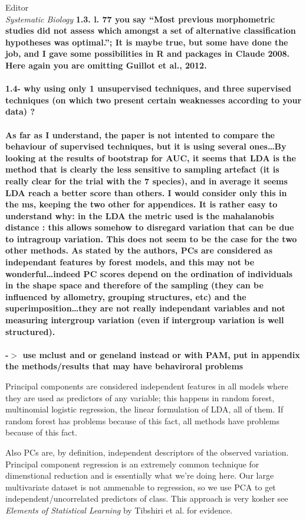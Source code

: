 \documentclass{letter}
\begin{document}
\begin{letter}{Editor \\ \textit{Systematic Biology}}
  \textbf{1.3. l. 77 you say ``Most previous morphometric studies did not assess which amongst a set of alternative classification hypotheses was optimal.''; It is maybe true, but some have done the job, and I gave some possibilities in R and packages in Claude 2008. Here again you are omitting Guillot et al., 2012. \\\\
    1.4- why using only 1 unsupervised techniques, and three supervised techniques (on which two present certain weaknesses according to your data) ?\\\\
    As far as I understand, the paper is not intented to compare the behaviour of supervised techniques, but it is using several ones\ldots By looking at the results of bootstrap for AUC, it seems that LDA is the method that is clearly the less sensitive to sampling artefact (it is really clear for the trial with the 7 species), and in average it seems LDA reach a better score than others. I would consider only this in the ms, keeping the two other for appendices. It is rather easy to understand why: in the LDA the metric used is the mahalanobis distance : this allows somehow to disregard variation that can be due to intragroup variation. This does not seem to be the case for the two other methods. As stated by the authors, PCs are considered as independant features by forest models, and this may not be wonderful\ldots indeed PC scores depend on the ordination of individuals in the shape space and therefore of the sampling (they can be influenced by allometry, grouping structures, etc) and the superimposition\ldots they are not really independant variables and not measuring intergroup variation (even if intergroup variation is well structured). \\\\
  -\(>\) use mclust and or geneland instead or with PAM, put in appendix the methods/results that may have behaviroral problems}

  Principal components are considered independent features in all models where they are used as predictors of any variable; this happens in random forest, multinomial logistic regression, the linear formulation of LDA, all of them. If random forest has problems because of this fact, all methods have problems because of this fact. 

  Also PCs are, by definition, independent descriptors of the observed variation. Principal component regression is an extremely common technique for dimenstional reduction and is essentially what we're doing here. Our large multivariate dataset is not ammenable to regression, so we use PCA to get independent/uncorrelated predictors of class. This approach is very kosher see \textit{Elements of Statistical Learning} by Tibshiri et al. for evidence. 


\end{letter}
\end{document}
